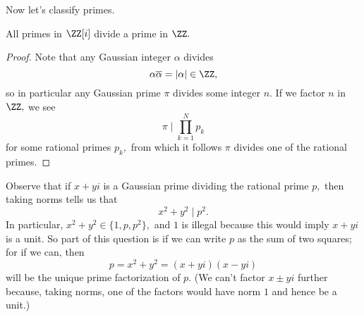 Now let's classify primes.
\begin{lemma} \label{lem:pliesoverp}
	All primes in $\ZZ[i]$ divide a prime in $\ZZ.$
\end{lemma}
\begin{proof}
	Note that any Gaussian integer $\alpha$ divides 
	\[\alpha\overline\alpha=|\alpha|\in\ZZ,\]
	so in particular any Gaussian prime $\pi$ divides some integer $n.$ If we factor $n$ in $\ZZ,$ we see
	\[\pi\mid\prod_{k=1}^Np_k\]
	for some rational primes $p_k,$ from which it follows $\pi$ divides one of the rational primes.
\end{proof}
Observe that if $x+yi$ is a Gaussian prime dividing the rational prime $p,$ then taking norms tells us that
\[x^2+y^2\mid p^2.\]
In particular, $x^2+y^2\in\{1,p,p^2\},$ and $1$ is illegal because this would imply $x+yi$ is a unit. So part of this question is if we can write $p$ as the sum of two squares; for if we can, then
\[p=x^2+y^2=(x+yi)(x-yi)\]
will be the unique prime factorization of $p.$ (We can't factor $x\pm yi$ further because, taking norms, one of the factors would have norm $1$ and hence be a unit.)

